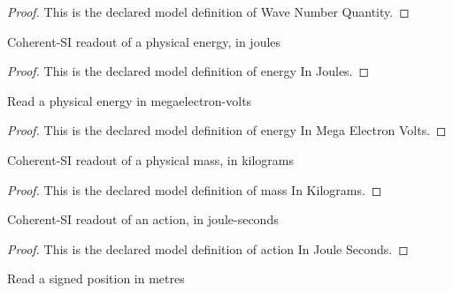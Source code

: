 \begin{proof}
  This is the declared model definition of Wave Number Quantity.
\end{proof}
\begin{definition}
  \label{def:physics:phyx-mini-0600:phyxminiproblems-problemphyxmini0600-energyinjoules}
  Coherent-SI readout of a physical energy, in joules
\end{definition}
\begin{proof}
  This is the declared model definition of energy In Joules.
\end{proof}
\begin{definition}
  \label{def:physics:phyx-mini-0600:phyxminiproblems-problemphyxmini0600-energyinmegaelectronvolts}
  Read a physical energy in megaelectron-volts
\end{definition}
\begin{proof}
  This is the declared model definition of energy In Mega Electron Volts.
\end{proof}
\begin{definition}
  \label{def:physics:phyx-mini-0600:phyxminiproblems-problemphyxmini0600-massinkilograms}
  Coherent-SI readout of a physical mass, in kilograms
\end{definition}
\begin{proof}
  This is the declared model definition of mass In Kilograms.
\end{proof}
\begin{definition}
  \label{def:physics:phyx-mini-0600:phyxminiproblems-problemphyxmini0600-actioninjouleseconds}
  Coherent-SI readout of an action, in joule-seconds
\end{definition}
\begin{proof}
  This is the declared model definition of action In Joule Seconds.
\end{proof}
\begin{definition}
  \label{def:physics:phyx-mini-0600:phyxminiproblems-problemphyxmini0600-positioninmeters}
  Read a signed position in metres
\end{definition}
